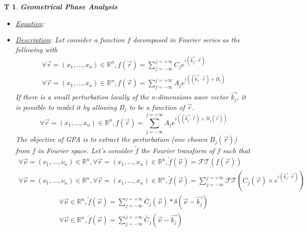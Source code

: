 \documentclass[12pt]{article}
\newtheorem{T}{T}
\begin{document}
\begin{T}
\label{T_2}
\noindent\colorbox{shadecolorT}{\normalfont \textbf{Geometrical Phase Analysis}}
\normalfont
\begin{itemize}
\item \underline{Equation}: 
\item \underline{Description}: Let consider a function $f$ decomposed in Fourier 
series as the following with 
\begin{equation}
\begin{gathered}
\forall \vec{r}=(x_1,...,x_n) \in \mathbb{R}^n, 
f(\vec{r})=\sum_{j=-\infty}^{j=+\infty}C_je^{i(\vec{k_j}\cdot\vec{r})} \\
\forall \vec{r}=(x_1,...,x_n) \in \mathbb{R}^n, 
f(\vec{r})=\sum_{j=-\infty}^{j=+\infty}A_je^{i((\vec{k_j}\cdot\vec{r})+B_j)}
\end{gathered}
\end{equation}
If there is a small perturbation locally of the n-dimensions wave vector 
$\vec{k_j}$, it is possible to model it by allowing $B_j$ to be a function of 
$\vec{r}$. 
\begin{equation}
\forall \vec{r}=(x_1,...,x_n) \in \mathbb{R}^n, 
f(\vec{r})=\sum_{j=-\infty}^{j=+\infty}A_je^{i((\vec{k_j}\cdot\vec{r})+B_j(\vec{r}))}
\end{equation}
The objective of GPA is to extract the perturbation (one chosen $B_j(\vec{r})$) 
from $f$ in Fourier space. Let's consider $\widetilde{f}$ the Fourier transform 
of $f$ such that
\begin{equation*}
\begin{gathered}
\forall \vec{\nu}=(\nu_1,...,\nu_n) \in \mathbb{R}^n, \forall 
\vec{r}=(x_1,...,x_n) \in \mathbb{R}^n, 
\widetilde{f}(\vec{\nu})=\mathcal{FT}(f(\vec{r})) \\
\forall \vec{\nu}=(\nu_1,...,\nu_n) \in \mathbb{R}^n, \forall 
\vec{r}=(x_1,...,x_n) \in \mathbb{R}^n, 
\widetilde{f}(\vec{\nu})=\sum_{j=-\infty}^{j=+\infty}\mathcal{FT}(C_j(\vec{r})\times 
e^{i(\vec{k_j}\cdot\vec{r})})
\end{gathered}
\end{equation*}
\begin{equation}
\begin{gathered}
\forall \vec{\nu}\in \mathbb{R}^n, 
\widetilde{f}(\vec{\nu})=\sum_{j=-\infty}^{j=+\infty}\widetilde{C_j}(\vec{\nu})\ast\delta(\vec{\nu}-\vec{k_j})\\
\forall \vec{\nu}\in \mathbb{R}^n, 
\widetilde{f}(\vec{\nu})=\sum_{j=-\infty}^{j=+\infty}\widetilde{C_j}(\vec{\nu}-\vec{k_j})

\end{gathered}
\end{equation}
\end{itemize}
\end{T}
\end{document}
